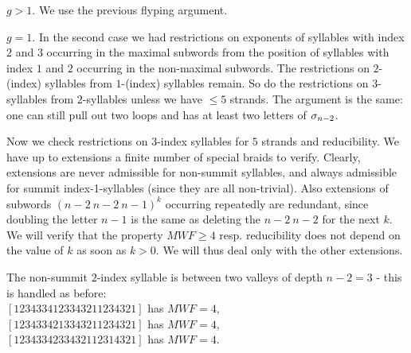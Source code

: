 \begin{caselist}
\case $g>1$. We use the previous flyping argument.
% 
% 

\case $g=1$.
In the second case we had restrictions on exponents of syllables
with index $2$ and $3$ occurring in the maximal subwords from
the position of syllables with index $1$ and $2$ occurring in
the non-maximal subwords. The restrictions on $2$-(index) syllables
from $1$-(index) syllables remain. So do the restrictions on
$3$-syllables from $2$-syllables unless we have $\le 5$
strands. The argument is the same: one can still pull
out two loops and has at least two letters of $\sigma_{n-2}$.

Now we check restrictions on $3$-index syllables for $5$ strands
and reducibility. We have up to extensions a finite number of
special braids to verify. Clearly, extensions are never
admissible for non-summit syllables, and always admissible for
summit index-1-syllables (since they are all non-trivial). 
Also extensions of subwords $(n-2\ n-2\ n-1)^k$ occurring
repeatedly are redundant, since doubling the letter $n-1$ is the
same as deleting the $n-2\ n-2$ for the next $k$. We
will verify that the property $MWF\ge 4$ resp. reducibility
does not depend on the value of $k$ as soon as $k>0$.
We will thus deal only with the other extensions.

\begin{caselist}
\case The non-summit $2$-index syllable is between two valleys
of depth $n-2=3$ - this is handled as before: \\
$[1234334123343211234321]$ has $MWF=4$, \\
$[1234334213343211234321]$ has $MWF=4$, \\
$[1234334233432112314321]$ has $MWF=4$.


\end{caselist}
\end{caselist}
